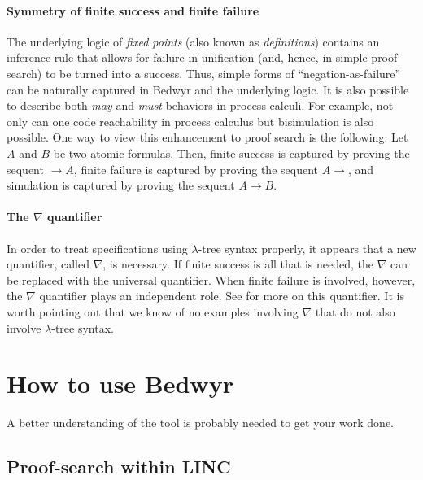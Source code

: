 \documentclass{article}
\begin{document}
\paragraph{Symmetry of finite success and finite failure}
The underlying logic of {\em fixed points} (also known as {\em
definitions})
\cite{girard92mail,schroeder-Heister93lics,mcdowell03tcs,momigliano03types}
contains an inference rule that allows for failure in unification
(and, hence, in simple proof search) to be turned into a success.
Thus, simple forms of ``negation-as-failure'' can be naturally
captured in Bedwyr and the underlying logic.  It is also possible to
describe both {\em may} and {\em must} behaviors in process calculi.
For example, not only can one code reachability in process calculus
but bisimulation is also possible.  One way to view this enhancement
to proof search is the following: Let $A$ and $B$ be two atomic
formulas.  Then, finite success is captured by proving the sequent
$\longrightarrow A$, finite failure is captured by proving the sequent
$A\longrightarrow$, and simulation is captured by proving the sequent
$A\longrightarrow B$.

\paragraph{The $\nabla$ quantifier}
In order to treat specifications using $\lambda$-tree syntax
properly, it appears that a new quantifier, called $\nabla$, is
necessary.  If finite success is all that is needed, the $\nabla$ can
be replaced with the universal quantifier.  When finite failure is
involved, however, the $\nabla$ quantifier plays an independent role.
See \cite{miller05tocl,tiu04phd,tiu05concur} for more on this
quantifier.  It is worth pointing out that we know of no examples
involving $\nabla$ that do not also involve $\lambda$-tree syntax.


\section{How to use Bedwyr}
\label{sec:howto}

A better understanding of the tool is probably needed to get your work
done. 

\subsection{Proof-search within LINC}
\label{psearch}
\end{document}
